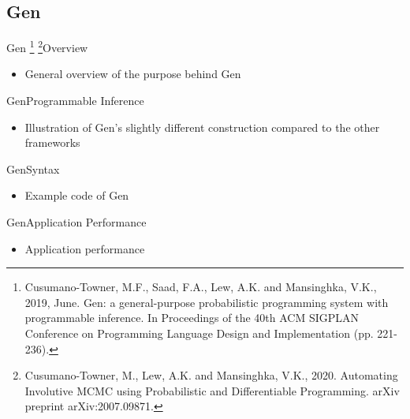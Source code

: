 \documentclass[AERbeamer%
              ,optEnglish%
              ,optBiber%
              ,optBibstyleAlphabetic%
              ,optBeamerClassicFormat%
              ]{AERlatex}%
\begin{document}
\subsection{Gen}
\begin{frame}[c]{Gen \footnote{Cusumano-Towner, M.F., Saad, F.A., Lew, A.K. and Mansinghka, V.K., 2019, June. Gen: a general-purpose
                               probabilistic programming system with programmable inference. In Proceedings of the 40th ACM SIGPLAN
                               Conference on Programming Language Design and Implementation (pp. 221-236).}
                     \footnote{Cusumano-Towner, M., Lew, A.K. and Mansinghka, V.K., 2020. Automating Involutive MCMC using
                               Probabilistic and Differentiable Programming. arXiv preprint arXiv:2007.09871.}}{Overview}
    \centering
    \begin{itemize} %
        \item General overview of the purpose behind Gen
    \end{itemize}
\end{frame}


\begin{frame}[c]{Gen}{Programmable Inference}
    \centering
    \begin{itemize}
        \item Illustration of Gen's slightly different construction compared to the other frameworks
    \end{itemize}
\end{frame}

\begin{frame}[c]{Gen}{Syntax}
    \centering
    \begin{itemize}
        \item Example code of Gen
    \end{itemize}
\end{frame}


\begin{frame}[c]{Gen}{Application Performance}
    \centering
    \begin{itemize}
        \item Application performance
    \end{itemize}
\end{frame}
\end{document}
